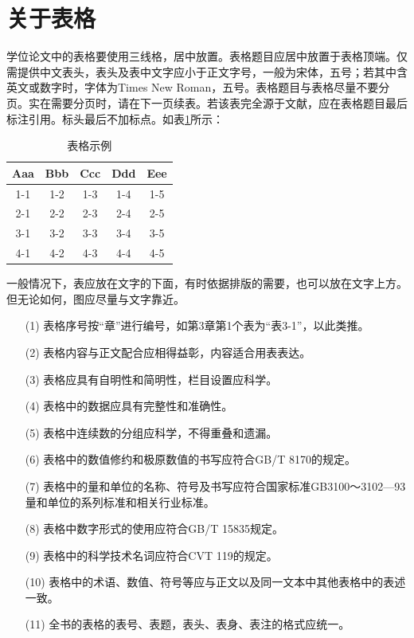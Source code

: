 \section{关于表格}
\label{sec:results}
学位论文中的表格要使用三线格，居中放置。表格题目应居中放置于表格顶端。仅需提供中文表头，表头及表中文字应小于正文字号，一般为宋体，五号；若其中含英文或数字时，字体为Times New Roman，五号。表格题目与表格尽量不要分页。实在需要分页时，请在下一页续表。若该表完全源于文献，应在表格题目最后标注引用。标头最后不加标点。如表\ref{Tab4-1}所示：

\begin{table}[htbp]
  \centering
  \caption{表格示例}
    \begin{tabular}{ccccc}
    \toprule
    Aaa & Bbb & Ccc & Ddd & Eee \\
    \midrule
    1-1  & 1-2  & 1-3 & 1-4 & 1-5 \\
    2-1  & 2-2  & 2-3 & 2-4 & 2-5 \\
    3-1  & 3-2  & 3-3 & 3-4 & 3-5 \\
    4-1  & 4-2  & 4-3 & 4-4 & 4-5 \\
    \bottomrule
    \end{tabular}%
  \label{Tab4-1}%
\end{table}%

一般情况下，表应放在文字的下面，有时依据排版的需要，也可以放在文字上方。但无论如何，图应尽量与文字靠近。

\begin{enumerate}
    \item[(1)] 表格序号按“章”进行编号，如第3章第1个表为“表3-1”，以此类推。
    \item[(2)] 表格内容与正文配合应相得益彰，内容适合用表表达。
    \item[(3)] 表格应具有自明性和简明性，栏目设置应科学。
    \item[(4)] 表格中的数据应具有完整性和准确性。
    \item[(5)] 表格中连续数的分组应科学，不得重叠和遗漏。
    \item[(6)] 表格中的数值修约和极原数值的书写应符合GB/T 8170的规定。
    \item[(7)] 表格中的量和单位的名称、符号及书写应符合国家标准GB3100～3102—93量和单位的系列标准和相关行业标准。
    \item[(8)] 表格中数字形式的使用应符合GB/T 15835规定。
    \item[(9)] 表格中的科学技术名词应符合CVT 119的规定。
    \item[(10)] 表格中的术语、数值、符号等应与正文以及同一文本中其他表格中的表述一致。
    \item[(11)] 全书的表格的表号、表题，表头、表身、表注的格式应统一。
\end{enumerate}

